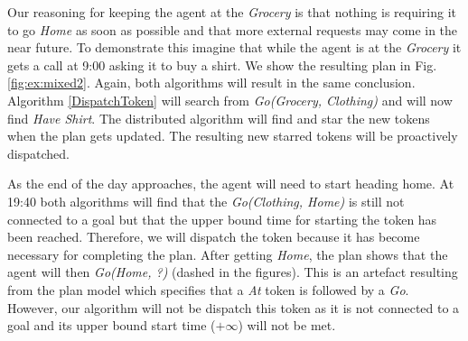 Our reasoning for keeping the agent at the {\em Grocery} is that
nothing is requiring it to go {\em Home} as soon as possible and that
more external requests may come in the near future. To demonstrate
this imagine that while the agent is at the {\em Grocery} it gets a
call at 9:00 asking it to buy a shirt.  We show the resulting plan in
Fig. \ref{fig:ex:mixed2}. Again, both algorithms will result in the
same conclusion. Algorithm \ref{DispatchToken} will search from {\em
Go(Grocery, Clothing)} and will now find {\em Have Shirt}. The
distributed algorithm will find and star the new tokens when the plan
gets updated. The resulting new starred tokens will be proactively
dispatched.

As the end of the day approaches, the agent will need to start heading
home. At 19:40 both algorithms will find that the {\em Go(Clothing,
Home)} is still not connected to a goal but that the upper bound time
for starting the token has been reached. Therefore, we will dispatch
the token because it has become necessary for completing the plan.
After getting {\em Home}, the plan shows that the agent will then {\em
Go(Home, ?)} (dashed in the figures). This is an artefact resulting
from the plan model which specifies that a {\em At} token is followed by a {\em Go}. 
However, our algorithm will not be dispatch this token as 
it is not connected to a goal and its upper bound start time
($+\infty$) will not be met.



